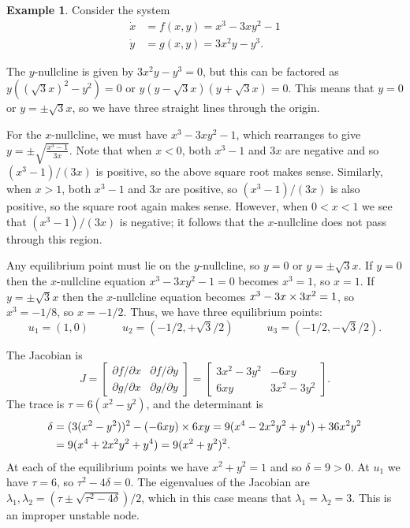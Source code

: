 \documentclass[reqno]{amsart}
\theoremstyle{definition}
\newtheorem{example}[theorem]{Example}
\begin{document}
\newpage

\begin{example}\label{eg-complex-cube-offset}
 Consider the system 
 \begin{align*}
  \dot{x} &= f(x,y) = x^3-3xy^2-1 \\
  \dot{y} &= g(x,y) = 3x^2y-y^3.
 \end{align*}

 The $y$-nullcline is given by $3x^2y-y^3=0$, but this can be factored
 as $y((\sqrt{3}x)^2-y^2)=0$ or $y(y-\sqrt{3}x)(y+\sqrt{3}x)=0$.  This
 means that $y=0$ or $y=\pm\sqrt{3}x$, so we have three straight lines
 through the origin.  

 For the $x$-nullcline, we must have $x^3-3xy^2-1$, which rearranges
 to give $y=\pm\sqrt{\frac{x^3-1}{3x}}$.  Note that when $x<0$, both
 $x^3-1$ and $3x$ are negative and so $(x^3-1)/(3x)$ is positive, so
 the above square root makes sense.  Similarly, when $x>1$, both
 $x^3-1$ and $3x$ are positive, so $(x^3-1)/(3x)$ is also positive, so
 the square root again makes sense.  However, when $0<x<1$ we see that
 $(x^3-1)/(3x)$ is negative; it follows that the $x$-nullcline does
 not pass through this region.

 Any equilibrium point must lie on the $y$-nullcline, so $y=0$ or
 $y=\pm\sqrt{3}x$.  If $y=0$ then the $x$-nullcline equation
 $x^3-3xy^2-1=0$ becomes $x^3=1$, so $x=1$.  If $y=\pm\sqrt{3}x$ then
 the $x$-nullcline equation becomes $x^3-3x\times 3x^2=1$, so $x^3=-1/8$,
 so $x=-1/2$.  Thus, we have three equilibrium points:
 \[ u_1 = (1,0) \hspace{3em}
    u_2 = (-1/2,+\sqrt{3}/2) \hspace{3em}
    u_3 = (-1/2,-\sqrt{3}/2).
 \]

 The Jacobian is 
 \[ J = \left[\begin{array}{cc} \partial f/\partial x & \partial f/\partial y \\
             \partial g/\partial x & \partial g/\partial y \end{array}\right]
      = \left[\begin{array}{cc} 3x^2-3y^2 & -6xy \\ 6xy & 3x^2-3y^2 \end{array}\right].
 \]
 The trace is $\tau=6(x^2-y^2)$, and the determinant is
 \begin{align*}
  \delta &= (3(x^2-y^2))^2 - (-6xy)\times 6xy =
         9(x^4-2x^2y^2+y^4) + 36x^2y^2 \\
      &= 9(x^4+2x^2y^2+y^4) = 9(x^2+y^2)^2.
 \end{align*}
 At each of the equilibrium points we have $x^2+y^2=1$ and so
 $\delta=9>0$.  At $u_1$ we have $\tau=6$, so $\tau^2-4\delta=0$.  The
 eigenvalues of the Jacobian are
 $\lambda_1,\lambda_2=(\tau\pm\sqrt{\tau^2-4\delta})/2$, which in this case means
 that $\lambda_1=\lambda_2=3$.  This is an improper unstable node.


\end{example}
\end{document}
